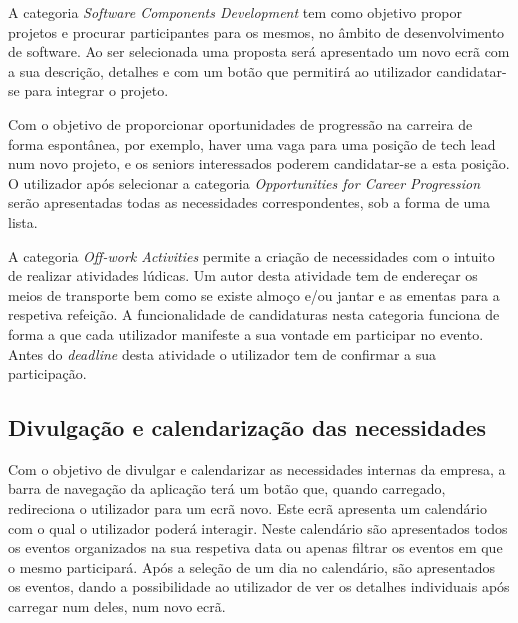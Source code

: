 A categoria \textit{Software Components Development} tem como objetivo propor projetos e procurar participantes para os mesmos, no âmbito de desenvolvimento de software. 
Ao ser selecionada uma proposta será apresentado um novo ecrã com a sua descrição, detalhes e com um botão que permitirá ao utilizador 
candidatar-se para integrar o projeto.

Com o objetivo de proporcionar oportunidades de progressão na carreira de forma espontânea, por exemplo, 
haver uma vaga para uma posição de tech lead num novo projeto, e os seniors interessados poderem candidatar-se a esta posição. 
O utilizador após selecionar a categoria \textit{Opportunities for Career Progression} serão apresentadas todas as necessidades correspondentes, sob a forma de uma lista.

A categoria \textit{Off-work Activities} permite a criação de necessidades com o intuito de realizar atividades lúdicas.
Um autor desta atividade tem de endereçar os meios de transporte bem como se existe almoço e/ou jantar e as ementas para a respetiva refeição. 
A funcionalidade de candidaturas nesta categoria funciona de forma a que cada utilizador manifeste a sua vontade em participar no evento.
Antes do \textit{deadline} desta atividade o utilizador tem de confirmar a sua participação.

\subsection{Divulgação e calendarização das necessidades}

Com o objetivo de divulgar e calendarizar as necessidades internas da empresa, a barra de navegação da aplicação terá um botão que, quando carregado, 
redireciona o utilizador para um ecrã novo. 
Este ecrã apresenta um calendário com o qual o utilizador poderá interagir.  
Neste calendário são apresentados todos os eventos organizados na sua respetiva data ou apenas filtrar os eventos em que o mesmo participará. 
Após a seleção de um dia no calendário, são apresentados os eventos, dando a possibilidade ao utilizador de ver os detalhes individuais após carregar num deles, 
num novo ecrã.

